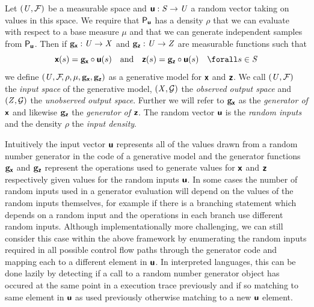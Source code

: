 \begin{definition}\label{def:generative-model}
Let $(\mathit{U},\mathcal{F})$ be a measurable space and $\boldsymbol{\mathsf{u}}: \mathit{S} \to \mathit{U}$ a random vector taking on values in this space. We require that $\mathsf{P}_{\boldsymbol{\mathsf{u}}}$ has a density $\rho$ that we can evaluate with respect to a base measure $\mu$ and that we can generate independent samples from $\mathsf{P}_{\boldsymbol{\mathsf{u}}}$. Then if ${\mathbf{g}}_{\boldsymbol{\mathsf{x}}} : \mathit{U} \to \mathit{X}$ and ${\mathbf{g}}_{\boldsymbol{\mathsf{z}}} : \mathit{U} \to \mathit{Z}$ are measurable functions such that
\begin{equation}
  \rvct{x}(s) = \genfunc_{\rvct{x}}\circ\rvct{u}(s)
  \quad\textrm{and}\quad
  \rvct{z}(s) = \genfunc_{\rvct{z}}\circ\rvct{u}(s)
  \quad \forall s \in \set{S}
\end{equation}
we define $(\mathit{U},\mathcal{F}\kern-2pt,\rho,\mu,{\mathbf{g}}_{\boldsymbol{\mathsf{x}}},{\mathbf{g}}_{\boldsymbol{\mathsf{z}}})$ as a generative model for $\boldsymbol{\mathsf{x}}$ and $\boldsymbol{\mathsf{z}}$. We call $(\mathit{U},\mathcal{F})$ the \emph{input space} of the generative model, $(\mathit{X},\mathcal{G})$ the \emph{observed output space} and $(\mathit{Z},\mathcal{G})$ the \emph{unobserved output space}. Further we will refer to ${\mathbf{g}}_{\boldsymbol{\mathsf{x}}}$ as the \emph{generator of $\boldsymbol{\mathsf{x}}$} and likewise ${\mathbf{g}}_{\boldsymbol{\mathsf{z}}}$ the \emph{generator of $\boldsymbol{\mathsf{z}}$}. The random vector $\boldsymbol{\mathsf{u}}$ is the \emph{random inputs} and the density $\rho$ the \emph{input density}.
\end{definition}

Intuitively the input vector $\boldsymbol{\mathsf{u}}$ represents all of the values drawn from a random number generator in the code of a generative model and the generator functions ${\mathbf{g}}_{\boldsymbol{\mathsf{x}}}$ and ${\mathbf{g}}_{\boldsymbol{\mathsf{z}}}$ represent the operations used to generate values for $\boldsymbol{\mathsf{x}}$ and $\boldsymbol{\mathsf{z}}$ respectively given values for the random inputs $\boldsymbol{\mathsf{u}}$. In some cases the number of random inputs used in a generator evaluation will depend on the values of the random inputs themselves, for example if there is a branching statement which depends on a random input and the operations in each branch use different random inputs. Although implementationally more challenging, we can still consider this case within the above framework by enumerating the random inputs required in all possible control flow paths through the generator code and mapping each to a different element in $\boldsymbol{\mathsf{u}}$. In interpreted languages, this can be done lazily by detecting if a call to a random number generator object  has occured at the same point in a execution trace previously and if so matching to same element in $\boldsymbol{\mathsf{u}}$ as used previously otherwise matching to a new $\boldsymbol{\mathsf{u}}$ element.%

